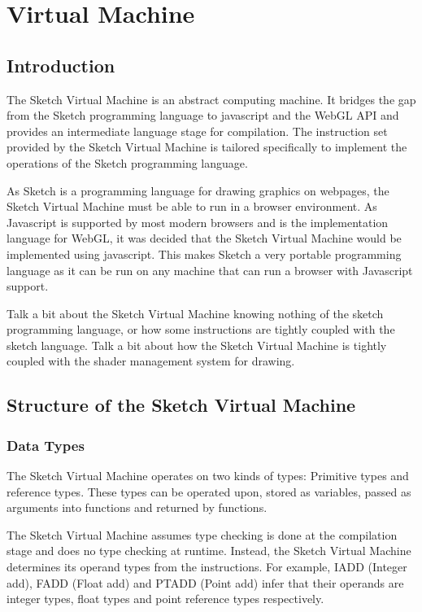 \documentclass{l3proj}
\begin{document}
\section{Virtual Machine}
\label{arch-abs}

\subsection{Introduction}
The Sketch Virtual Machine is an abstract computing machine. It bridges the gap from the Sketch programming language to javascript and the WebGL API and provides an intermediate language stage for compilation. The instruction set provided by the Sketch Virtual Machine is tailored specifically to implement the operations of the Sketch programming language.

As Sketch is a programming language for drawing graphics on webpages, the Sketch Virtual Machine must be able to run in a browser environment. As Javascript is supported by most modern browsers and is the implementation language for WebGL, it was decided that the Sketch Virtual Machine would be implemented using javascript. This makes Sketch a very portable programming language as it can be run on any machine that can run a browser with Javascript support.

Talk a bit about the Sketch Virtual Machine knowing nothing of the sketch programming language, or how some instructions are tightly coupled with the sketch language.
Talk a bit about how the Sketch Virtual Machine is tightly coupled with the shader management system for drawing.

\subsection{Structure of the Sketch Virtual Machine}

\subsubsection{Data Types}
The Sketch Virtual Machine operates on two kinds of types: Primitive types and reference types. These types can be operated upon, stored as variables, passed as arguments into functions and returned by functions. 

The Sketch Virtual Machine assumes type checking is done at the compilation stage and does no type checking at runtime. Instead, the Sketch Virtual Machine determines its operand types from the instructions. For example, IADD (Integer add), FADD (Float add) and PTADD (Point add) infer that their operands are integer types, float types and point reference types respectively. 
\end{document}
